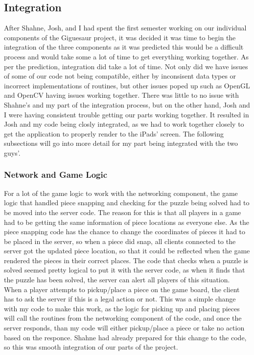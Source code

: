 \documentclass{article}
\begin{document}
\subsection{Integration}
After Shahne, Josh, and I had spent the first semester working on our individual
components of the Giguesaur project, it was decided it was time to begin the
integration of the three components as it was predicted this would be a
difficult process and would take some a lot of time to get everything working
together. As per the prediction, integration did take a lot of time. Not only
did we have issues of some of our code not being compatible, either by
inconsisent data types or incorrect implementations of routines, but other
issues poped up such as OpenGL and OpenCV having issues working together. There
was little to no issue with Shahne's and my part of the integration process, but
on the other hand, Josh and I were having consistent trouble getting our parts
working together. It resulted in Josh and my code being closly integrated, as we
had to work together closely to get the application to properly render to the
iPads' screen. The following subsections will go into more detail for my part
being integrated with the two guys'.

\subsubsection{Network and Game Logic}
For a lot of the game logic to work with the networking component, the game
logic that handled piece snapping and checking for the puzzle being solved had
to be moved into the server code. The reason for this is that all players in a
game had to be getting the same information of piece locations as everyone
else. As the piece snapping code has the chance to change the coordinates of
pieces it had to be placed in the server, so when a piece did snap, all clients
connected to the server got the updated piece location, so that it could be
reflected when the game rendered the pieces in their correct places. The code
that checks when a puzzle is solved seemed pretty logical to put it with the
server code, as when it finds that the puzzle has been solved, the server can
alert all players of this situation.\\

When a player attempts to pickup/place a piece on the game board, the client
has to ask the server if this is a legal action or not. This was a simple change
with my code to make this work, as the logic for picking up and placing pieces
will call the routines from the networking component of the code, and once the
server responds, than my code will either pickup/place a piece or take no action
based on the responce. Shahne had already prepared for this change to the code,
so this was smooth integration of our parts of the project.\\
\end{document}
